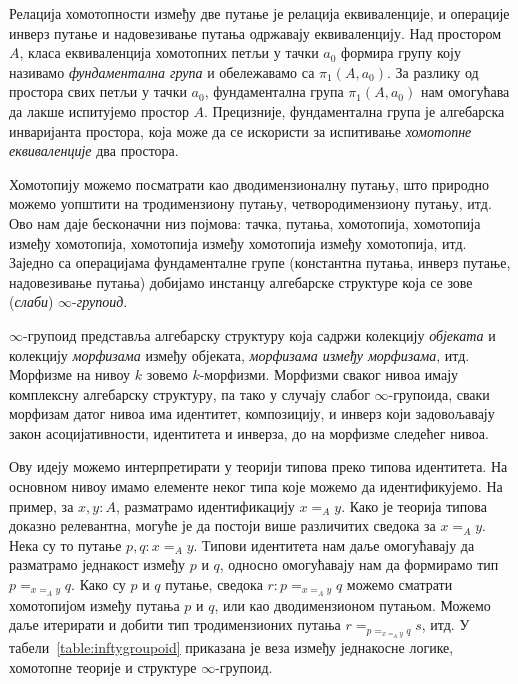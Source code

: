 \documentclass[12pt,oneside]{memoir}
\begin{document}
Релација хомотопности између две путање је релација еквиваленције, и операције инверз путање и надовезивање путања одржавају еквиваленцију. Над простором $A$, класа еквиваленција хомотопних петљи у тачки $a_0$ формира групу коју називамо \emph{фундаментална група} и обележавамо са $\pi_1(A, a_0)$. За разлику од простора свих петљи у тачки $a_0$, фундаментална група $\pi_1(A, a_0)$ нам омогућава да лакше испитујемо простор $A$. Прецизније, фундаментална група је алгебарска инваријанта
простора, која може да се искористи за испитивање \emph{хомотопне еквиваленције} два простора.

Хомотопију можемо посматрати као дводимензионалну путању, што природно можемо уопштити на тродимензиону путању, четвородимензиону путању, итд. Ово нам даје бесконачни низ појмова: тачка, путања, хомотопија, хомотопија између хомотопија, хомотопија између хомотопија између хомотопија, итд. Заједно са операцијама фундаменталне групе (константна путања, инверз путање, надовезивање путања) добијамо инстанцу алгебарске структуре која се зове (\emph{слаби}) $\infty$-\emph{групоид}.

$\infty$-групоид представља алгебарску структуру која садржи колекцију \emph{објеката} и колекцију \emph{морфизама} између објеката, \emph{морфизама између морфизама}, итд. Морфизме на нивоу $k$ зовемо $k$-морфизми. Морфизми сваког нивоа имају комплексну алгебарску структуру, па тако у случају слабог $\infty$-групоида, сваки морфизам датог нивоа има идентитет, композицију, и инверз који задовољавају закон асоцијативности, идентитета и инверза, до на морфизме следећег нивоа.

Ову идеју можемо интерпретирати у теорији типова преко типова идентитета. На основном нивоу имамо елементе неког типа које можемо да идентификујемо. На пример, за $x, y : A$, разматрамо идентификацију $x =_A y$. Како је теорија типова доказно релевантна, могуће је да постоји више различитих сведока за $x =_A y$. Нека су то путање $p, q : x =_A y$. Типови идентитета нам даље омогућавају да разматрамо једнакост између $p$ и $q$, односно омогућавају нам да формирамо тип $p =_{x =_A y} q$. Како су $p$ и $q$ путање, сведока $r : p =_{x =_A y} q$ можемо сматрати хомотопијом између путања $p$ и $q$, или као дводимензионом путањом. Можемо даље итерирати и добити тип тродимензионих путања $r =_{p =_{x =_A y} q} s$, итд. У табели~\ref{table:inftygroupoid} приказана је веза између једнакосне логике, хомотопне теорије и структуре $\infty$-групоид.
\end{document}
